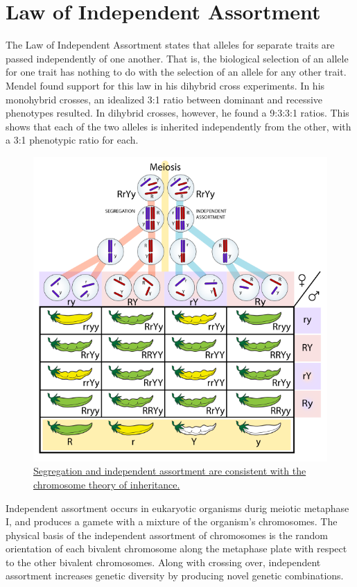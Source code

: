 \hypertarget{law-of-independent-assortment}{%
\section{Law of Independent Assortment}\label{law-of-independent-assortment}}

The Law of Independent Assortment states that alleles for separate traits are passed independently of one another. That is, the biological selection of an allele for one trait has nothing to do with the selection of an allele for any other trait. Mendel found support for this law in his dihybrid cross experiments. In his monohybrid crosses, an idealized 3:1 ratio between dominant and recessive phenotypes resulted. In dihybrid crosses, however, he found a 9:3:3:1 ratios. This shows that each of the two alleles is inherited independently from the other, with a 3:1 phenotypic ratio for each.



\begin{figure}

{\centering \includegraphics[width=0.7\linewidth]{./figures/mendel/Independent_assortment_&_segregation} 

}

\caption{\href{https://commons.wikimedia.org/wiki/File:Independent_assortment_\%26_segregation.svg}{Segregation and independent assortment are consistent with the chromosome theory of inheritance.}}\label{fig:assortment}
\end{figure}

Independent assortment occurs in eukaryotic organisms durig meiotic metaphase I, and produces a gamete with a mixture of the organism's chromosomes. The physical basis of the independent assortment of chromosomes is the random orientation of each bivalent chromosome along the metaphase plate with respect to the other bivalent chromosomes. Along with crossing over, independent assortment increases genetic diversity by producing novel genetic combinations.

